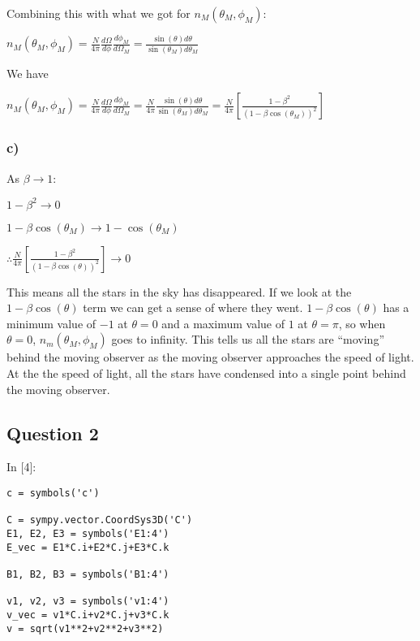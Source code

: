 \documentclass[11pt]{article}
\newif\ifcode
\newif\ifleftmargins
\newlength{\promptlength}
\newcommand{\prompt}[3]{
        \needspace{1.1cm}
        \settowidth{\promptlength}{ #1 [#3] }
        \ifleftmargins\hspace{-\promptlength}\hspace{-5pt}\fi
        {\color{#2}#1 [#3]:}
        \ifleftmargins\vspace{-2.7ex}\fi
    }
\begin{document}
    Combining this with what we got for \(n_M(\theta_M, \phi_M)\):

\(n_M(\theta_M, \phi_M) = \frac{N}{4\pi} \frac{d\Omega}{d\phi} \frac{d\phi_M}{d\Omega_M} = \frac{\sin(\theta) d\theta}{\sin(\theta_M)d\theta_M}\)

We have

\(n_M(\theta_M, \phi_M) = \frac{N}{4\pi} \frac{d\Omega}{d\phi} \frac{d\phi_M}{d\Omega_M} = \frac{N}{4\pi} \frac{\sin(\theta) d\theta}{\sin(\theta_M)d\theta_M} = \frac{N}{4\pi} \left[ \frac{1 - \beta^2 }{(1-\beta\cos(\theta_M))^2} \right]\)

    \hypertarget{c}{%
\subsubsection{c)}\label{c}}

As \(\beta \rightarrow 1\):

\(1-\beta^2 \rightarrow 0\)

\(1-\beta \cos(\theta_M) \rightarrow 1-\cos(\theta_M)\)

\(\therefore \frac{N}{4\pi} \left[ \frac{1 - \beta^2 }{(1-\beta\cos(\theta))^2} \right] \rightarrow 0\)

    This means all the stars in the sky has disappeared. If we look at the
\(1-\beta \cos(\theta)\) term we can get a sense of where they went.
\(1-\beta \cos(\theta)\) has a minimum value of \(-1\) at \(\theta = 0\)
and a maximum value of \(1\) at \(\theta = \pi\), so when
\(\theta = 0\), \(n_m(\theta_M, \phi_M)\) goes to infinity. This tells
us all the stars are ``moving'' behind the moving observer as the moving
observer approaches the speed of light. At the the speed of light, all
the stars have condensed into a single point behind the moving observer.

    \hypertarget{question-2}{%
\subsection{Question 2}\label{question-2}}

    
\prompt{In}{incolor}{4}
\codetrue
\begin{tcolorbox}[breakable, size=fbox, boxrule=1pt, pad at break*=1mm, colback=cellbackground, colframe=cellborder]
\begin{verbatim}
c = symbols('c')

C = sympy.vector.CoordSys3D('C')
E1, E2, E3 = symbols('E1:4')
E_vec = E1*C.i+E2*C.j+E3*C.k

B1, B2, B3 = symbols('B1:4')

v1, v2, v3 = symbols('v1:4')
v_vec = v1*C.i+v2*C.j+v3*C.k
v = sqrt(v1**2+v2**2+v3**2)
\end{verbatim}
\end{tcolorbox}
\codefalse
\end{document}
